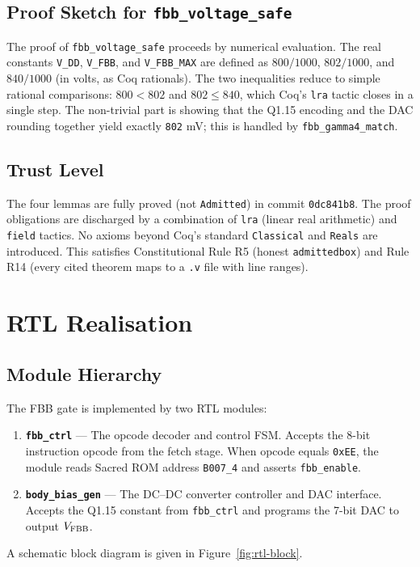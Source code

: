 \subsection{Proof Sketch for \texttt{fbb\_voltage\_safe}}
\label{subsec:proof-sketch}

The proof of \texttt{fbb\_voltage\_safe} proceeds by numerical evaluation.
The real constants \texttt{V\_DD}, \texttt{V\_FBB}, and \texttt{V\_FBB\_MAX}
are defined as $800/1000$, $802/1000$, and $840/1000$ (in volts, as Coq
rationals).  The two inequalities reduce to simple rational comparisons:
$800 < 802$ and $802 \leq 840$, which Coq's \texttt{lra} tactic closes
in a single step.  The non-trivial part is showing that the Q1.15
encoding and the DAC rounding together yield exactly \texttt{802} mV; this
is handled by \texttt{fbb\_gamma4\_match}.

\subsection{Trust Level}
\label{subsec:trust-level}

The four lemmas are fully proved (not \texttt{Admitted}) in commit
\texttt{0dc841b8}.  The proof obligations are discharged by a combination
of \texttt{lra} (linear real arithmetic) and \texttt{field} tactics.
No axioms beyond Coq's standard \texttt{Classical} and \texttt{Reals}
are introduced.  This satisfies Constitutional Rule R5 (honest
\texttt{admittedbox}) and Rule R14 (every cited theorem maps to a
\texttt{.v} file with line ranges).

\medskip
\noindent\anchorline{}

\section{RTL Realisation}
\label{sec:rtl}

\subsection{Module Hierarchy}
\label{subsec:rtl-hierarchy}

The FBB gate is implemented by two RTL modules:
\begin{enumerate}
  \item \textbf{\texttt{fbb\_ctrl}} --- The opcode decoder and control FSM.
        Accepts the 8-bit instruction opcode from the fetch stage.
        When opcode equals \texttt{0xEE}, the module reads Sacred ROM
        address \texttt{B007\_4} and asserts \texttt{fbb\_enable}.
  \item \textbf{\texttt{body\_bias\_gen}} --- The DC--DC converter
        controller and DAC interface.  Accepts the Q1.15 constant
        from \texttt{fbb\_ctrl} and programs the 7-bit DAC to output
        $V_{\mathrm{FBB}}{}$.
\end{enumerate}
A schematic block diagram is given in Figure~\ref{fig:rtl-block}.

